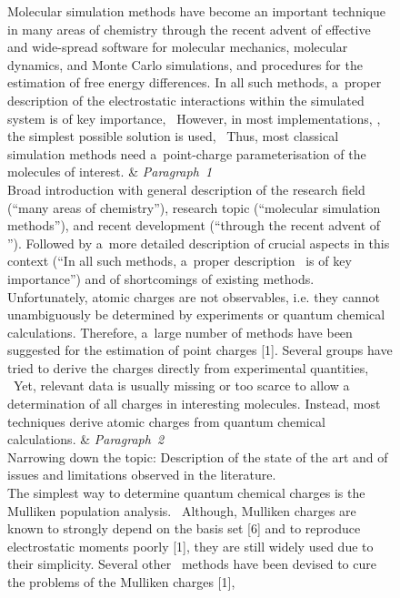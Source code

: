 \begin{figure}[p]
	\begin{tblr}{}
		Molecular simulation methods have become an important technique in many areas of chemistry through the recent advent of effective and wide-spread software for molecular mechanics, molecular dynamics, and Monte Carlo simulations, and procedures for the estimation of free energy differences. In all such methods, a~proper description of the electrostatic interactions within the simulated system is of key importance, \textellipsis\ However, in most implementations, \textellipsis, the simplest possible solution is used, \textellipsis\ Thus, most classical simulation methods need a~point-charge parameterisation of the molecules of interest.
		&
		{%
			\textit{Paragraph~1} \\
			\textmd{Broad introduction with general description of the research field (``many areas of
			chemistry''), research topic (``molecular simulation methods''), and recent development (``through the recent advent of \textellipsis''). Followed by a~more detailed description of crucial aspects in this context (``In all such methods, a~proper description \textellipsis\ is of key importance'') and of shortcomings of existing methods.}
		}
		\\
		\hspace{\baselineskip}Unfortunately, atomic charges are not observables, i.e. they cannot unambiguously be determined by experiments or quantum chemical calculations. Therefore, a~large number of methods have been suggested for the estimation of point charges [1]. Several groups have tried to derive the charges directly from experimental quantities, \textellipsis\ Yet, relevant data is usually missing or too scarce to allow a determination of all charges in interesting molecules. Instead, most techniques derive atomic charges from quantum chemical calculations.
		&
		{%
			\textit{Paragraph~2} \\
			Narrowing down the topic: Description of the state of the art and of issues and limitations observed in the literature.%
		}
		\\
		{%
			\hspace{\baselineskip}The simplest way to determine quantum chemical charges is the Mulliken population
			analysis. \textellipsis\ Although, Mulliken charges are known to strongly depend on the basis set [6] and to reproduce electrostatic moments poorly [1], they are still widely used due to their simplicity. Several other \textellipsis\ methods have been devised to cure the problems of the Mulliken charges [1], \textellipsis
}
\end{tblr}
\end{figure}
